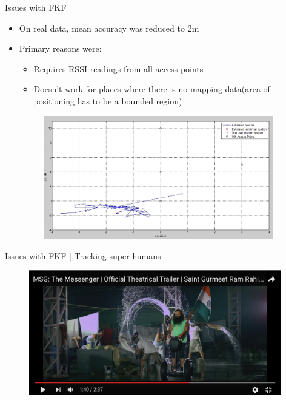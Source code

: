 \documentclass{beamer}
\begin{document}
\begin{frame}{Issues with FKF}
\begin{itemize}
  \item On real data, mean accuracy was reduced to 2m
  \item Primary reasons were:
    \begin{itemize}
      \item Requires RSSI readings from all access points
      \item Doesn't work for places where there is no mapping data(area of positioning has to be a bounded region)
    \end{itemize}
    \begin{figure} [ht!]
      \includegraphics[width=100mm]{images/kalmanwithoutmapping.jpg}
    \end{figure}
   
\end{itemize}
\vskip 1cm
\end{frame}
\begin{frame}{Issues with FKF | Tracking super humans}
  \begin{figure} [ht!]
    \includegraphics[width=110mm]{images/msg5.png}
  \end{figure}
\vskip 1cm
\end{frame}
\end{document}
